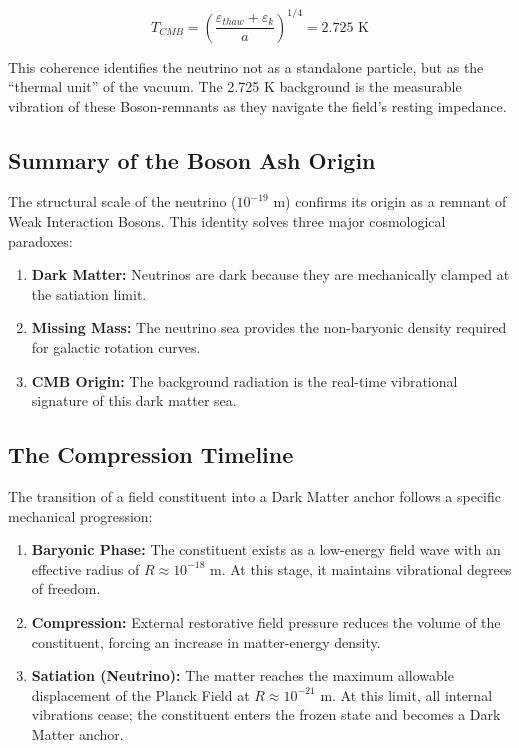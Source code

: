 \begin{equation}
T_{CMB} = \left( \frac{\varepsilon_{thaw} + \varepsilon_k}{a} \right)^{1/4} = 2.725 \text{ K}
\end{equation}

This coherence identifies the neutrino not as a standalone particle, but as the ``thermal unit'' of the vacuum. The 2.725 K background is the measurable vibration of these Boson-remnants as they navigate the field's resting impedance.

\subsection{Summary of the Boson Ash Origin}
The structural scale of the neutrino ($10^{-19}$ m) confirms its origin as a remnant of Weak Interaction Bosons. This identity solves three major cosmological paradoxes:
\begin{enumerate}
    \item \textbf{Dark Matter:} Neutrinos are dark because they are mechanically clamped at the satiation limit.
    \item \textbf{Missing Mass:} The neutrino sea provides the non-baryonic density required for galactic rotation curves.
    \item \textbf{CMB Origin:} The background radiation is the real-time vibrational signature of this dark matter sea.
\end{enumerate}

\subsection{The Compression Timeline}
The transition of a field constituent into a Dark Matter anchor follows a specific mechanical progression:
\begin{enumerate}
    \item \textbf{Baryonic Phase:} The constituent exists as a low-energy field wave with an effective radius of $R \approx 10^{-18}$ m. At this stage, it maintains vibrational degrees of freedom.
    \item \textbf{Compression:} External restorative field pressure reduces the volume of the constituent, forcing an increase in matter-energy density.
    \item \textbf{Satiation (Neutrino):} The matter reaches the maximum allowable displacement of the Planck Field at $R \approx 10^{-21}$ m. At this limit, all internal vibrations cease; the constituent enters the frozen state and becomes a Dark Matter anchor.
\end{enumerate}

